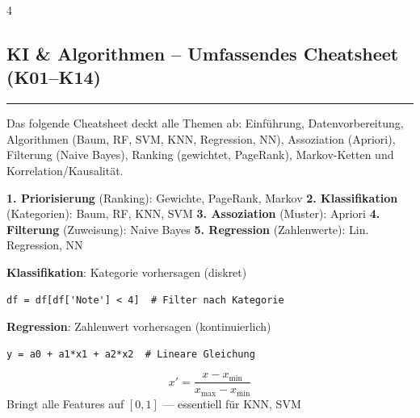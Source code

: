 \begin{landscape}
	\tiny
	\begin{multicols*}{4}
		\textcolor{\cheatSheetColor}{
			\begin{centering}
				\section*{KI \& Algorithmen -- Umfassendes Cheatsheet (K01--K14)}
			\end{centering}
			\hrule
			Das folgende Cheatsheet deckt alle Themen ab: Einführung, Datenvorbereitung, Algorithmen (Baum, RF, SVM, KNN, Regression, NN), Assoziation (Apriori), Filterung (Naive Bayes), Ranking (gewichtet, PageRank), Markov-Ketten und Korrelation/Kausalität.
			\vspace{0.2em}
		}


		\begin{cheatSheetBox}[title=Algorithmen nach Funktionsart]
			\textbf{1. Priorisierung} (Ranking): Gewichte, PageRank, Markov
			\textbf{2. Klassifikation} (Kategorien): Baum, RF, KNN, SVM
			\textbf{3. Assoziation} (Muster): Apriori
			\textbf{4. Filterung} (Zuweisung): Naive Bayes
			\textbf{5. Regression} (Zahlenwerte): Lin. Regression, NN
		\end{cheatSheetBox}

		\begin{cheatSheetBox}[title=Klassifikation vs. Regression]
			\textbf{Klassifikation}: Kategorie vorhersagen (diskret)
			\begin{lstlisting}
df = df[df['Note'] < 4]  # Filter nach Kategorie
			\end{lstlisting}
			\textbf{Regression}: Zahlenwert vorhersagen (kontinuierlich)
			\begin{lstlisting}
y = a0 + a1*x1 + a2*x2  # Lineare Gleichung
			\end{lstlisting}
		\end{cheatSheetBox}


		\begin{cheatSheetBox}[title=Min-Max-Normalisierung]
			\[x' = \frac{x - x_{\min}}{x_{\max} - x_{\min}}\]
			Bringt alle Features auf $[0, 1]$ — essentiell für KNN, SVM
		\end{cheatSheetBox}


\end{multicols*}
\end{landscape}

